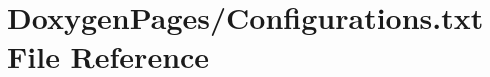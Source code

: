 \hypertarget{_configurations_8txt}{\section{Doxygen\-Pages/\-Configurations.txt File Reference}
\label{_configurations_8txt}
}
